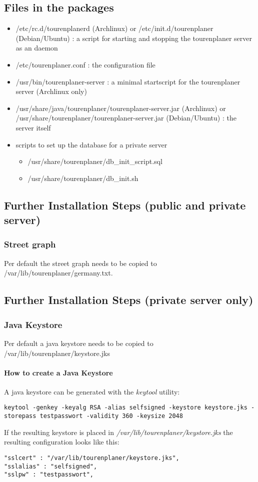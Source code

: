 \documentclass[ngerman,titlepage,parskip=true]{scrartcl}
\begin{document}
  \subsection{Files in the packages}
	\begin{itemize}
	  \item /etc/rc.d/tourenplanerd (Archlinux) or /etc/init.d/tourenplaner (Debian/Ubuntu) : a script for starting and stopping the tourenplaner server as an daemon
	  \item /etc/tourenplaner.conf : the configuration file
	  \item /usr/bin/tourenplaner-server : a minimal startscript for the tourenplaner server (Archlinux only)
	  \item /usr/share/java/tourenplaner/tourenplaner-server.jar (Archlinux) or /usr/share/tourenplaner/tourenplaner-server.jar (Debian/Ubuntu) : the server itself
	  \item scripts to set up the database for a private server
		\begin{itemize}
		  \item /usr/share/tourenplaner/db\_init\_script.sql
		  \item /usr/share/tourenplaner/db\_init.sh
		\end{itemize}
	\end{itemize}

	\subsection{Further Installation Steps  (public and private server)}
	\subsubsection{Street graph}
	 Per default the street graph needs to be copied to /var/lib/tourenplaner/germany.txt.
	\subsection{Further Installation Steps (private server only)}
	 \subsubsection{Java Keystore}
	 Per default a java keystore needs to be copied to /var/lib/tourenplaner/keystore.jks
	 \paragraph{How to create a Java Keystore}
	 A java keystore can be generated with the \textit{keytool} utility:
	 	\begin{lstlisting}
keytool -genkey -keyalg RSA -alias selfsigned -keystore keystore.jks -storepass testpasswort -validity 360 -keysize 2048
		\end{lstlisting}
		If the resulting keystore is placed in \textit{/var/lib/tourenplaner/keystore.jks} the resulting configuration looks like this:
	 	\begin{lstlisting}
"sslcert" : "/var/lib/tourenplaner/keystore.jks",
"sslalias" : "selfsigned",
"sslpw" : "testpasswort",
 		\end{lstlisting}
\end{document}
